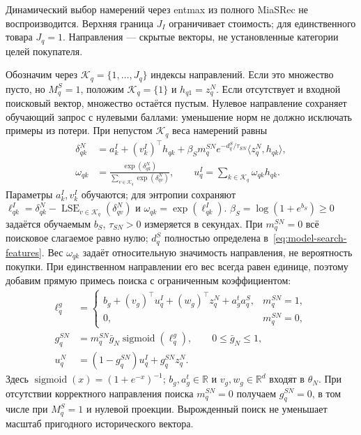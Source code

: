 \documentclass[12pt,a4paper]{article}
\newcommand{\R}{\mathbb R}
\DeclareMathOperator{\sigmoid}{sigmoid}
\theoremstyle{plainru}
\begin{document}
Динамический выбор намерений через entmax из полного MiaSRec
не воспроизводится. Верхняя граница $J_I$ ограничивает стоимость;
для единственного товара $J_q=1$. Направления --- скрытые векторы,
не установленные категории целей покупателя.

Обозначим через $\mathcal K_q=\{1,\ldots,J_q\}$ индексы направлений.
Если это множество пусто, но $M_q^S=1$, положим
$\mathcal K_q=\{1\}$ и $h_{q1}=z_q^N$.
Если отсутствует и входной поисковый вектор, множество остаётся пустым.
Нулевое направление сохраняет обучающий запрос с нулевыми баллами:
уменьшение норм не должно исключать примеры из потери.
При непустом $\mathcal K_q$ веса намерений равны
\begin{align}\label{eq:modern-intent-weights}
\delta_{qk}^{N}&=a_k^I+(v_k^I)^\top h_{qk}
+\beta_Sm_q^{SN}e^{-d_q^S/\tau_{SN}}
\langle z_q^N,h_{qk}\rangle,\\
\omega_{qk}&=\frac{\exp(\delta_{qk}^{N})}
{\sum_{v\in\mathcal K_q}\exp(\delta_{qv}^{N})},\qquad
u_q^I=\sum_{k\in\mathcal K_q}\omega_{qk}h_{qk}.
\nonumber
\end{align}
Параметры $a_k^I,v_k^I$ обучаются;
для энтропии сохраняют $\ell_{qk}^{I}=\delta_{qk}^N-
\operatorname{LSE}_{v\in\mathcal K_q}(\delta_{qv}^N)$ и
$\omega_{qk}=\exp(\ell_{qk}^{I})$.
$\beta_S=\log(1+e^{b_S})\ge0$ задаётся обучаемым $b_S$,
$\tau_{SN}>0$ измеряется в секундах.
При $m_q^{SN}=0$ всё поисковое слагаемое равно нулю;
$d_q^S$ полностью определена в~\eqref{eq:model-search-features}.
Вес $\omega_{qk}$ задаёт относительную значимость направления,
не вероятность покупки. При единственном направлении его вес всегда равен
единице, поэтому добавим прямую примесь поиска с ограниченным коэффициентом:
\begin{align}\label{eq:modern-search-gate}
\ell_q^g&=\begin{cases}
b_g+(v_g)^\top u_q^I+(w_g)^\top z_q^N+a_g^t a_q^S,
&m_q^{SN}=1,\\
0,&m_q^{SN}=0,
\end{cases}\\
g_q^{SN}&=m_q^{SN}\bar g_N\sigmoid(\ell_q^g),
\qquad 0\le\bar g_N\le1,\nonumber\\
u_q^N&=(1-g_q^{SN})u_q^I+g_q^{SN}z_q^N.
\nonumber
\end{align}
Здесь $\sigmoid(x)=(1+e^{-x})^{-1}$;
$b_g,a_g^t\in\R$ и $v_g,w_g\in\R^d$ входят в $\theta_N$.
При отсутствии корректного направления поиска $m_q^{SN}=0$
получаем $g_q^{SN}=0$, в том числе при $M_q^S=1$ и нулевой проекции.
Вырожденный поиск не уменьшает масштаб пригодного исторического вектора.
\end{document}
